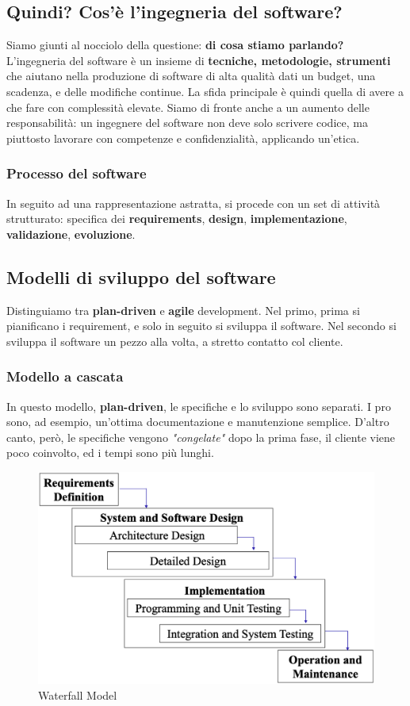 \documentclass[11pt]{article}
\begin{document}
\subsection{Quindi? Cos'è l'ingegneria del software?}
Siamo giunti al nocciolo della questione: \textbf{di cosa stiamo parlando?} L'ingegneria del software è un insieme di \textbf{tecniche, metodologie, strumenti} che aiutano nella produzione di software di alta qualità dati un budget, una scadenza, e delle modifiche continue. La sfida principale è quindi quella di avere a che fare con complessità elevate. 
Siamo di fronte anche a un aumento delle responsabilità: un ingegnere del software non deve solo scrivere codice, ma piuttosto lavorare con competenze e confidenzialità, applicando un'etica.
\subsubsection{Processo del software}
In seguito ad una rappresentazione astratta, si procede con un set di attività strutturato: specifica dei \textbf{requirements}, \textbf{design}, \textbf{implementazione}, \textbf{validazione}, \textbf{evoluzione}. 
\subsection{Modelli di sviluppo del software}
Distinguiamo tra \textbf{plan-driven} e \textbf{agile} development. Nel primo, prima si pianificano i requirement, e solo in seguito si sviluppa il software. Nel secondo si sviluppa il software un pezzo alla volta, a stretto contatto col cliente. 
\subsubsection{Modello a cascata}
In questo modello, \textbf{plan-driven}, le specifiche e lo sviluppo sono separati. I pro sono, ad esempio, un'ottima documentazione e manutenzione semplice. D'altro canto, però, le specifiche vengono \textit{"congelate"} dopo la prima fase, il cliente viene poco coinvolto, ed i tempi sono più lunghi. 
\begin{figure}[H]
    \centering
    \includegraphics[width=\linewidth]{res/teoria/WaterfallModel.png}
    \caption{Waterfall Model}
\end{figure}
\end{document}
